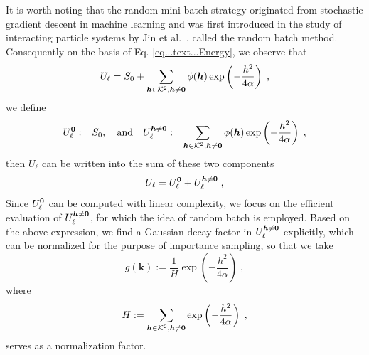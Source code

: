 It is worth noting that the random mini-batch strategy originated from stochastic gradient descent in machine learning and was first introduced in the study of interacting particle systems by Jin et al.~\cite{jin2020random}, called the random batch method. Consequently
on the basis of Eq. \eqref{eq...text...Energy},  we observe that 
\[
U_\ell =   S_0+ \sum_{\boldsymbol{h}\in\mathcal{K}^2,\boldsymbol{h}\neq\bm{0}}\phi(\boldsymbol{h}) \exp\left(-\frac{h^2}{4\alpha}\right) \;,
\]
we define 
\begin{equation}\label{eq::U_l0_Ulk}
    U_\ell^{\bm{0}} := S_0,\quad\text{and}\quad U_\ell^{\boldsymbol{h}\neq \bm{0}} :=\sum_{\boldsymbol{h}\in\mathcal{K}^2,\boldsymbol{h}\neq\bm{0}}\phi(\boldsymbol{h}) \exp\left(-\frac{h^2}{4\alpha}\right) \;,
\end{equation}
then $U_\ell$ can be written into the sum of these two components
\[
U_\ell= U_\ell^{\bm{0}}+U_\ell^{\boldsymbol{h}\neq \bm{0}}\;,
\]
Since 
$ U_\ell^{\bm{0}}$
can be computed with linear complexity, we focus on the efficient evaluation of 
$U_\ell^{\boldsymbol{h}\neq \bm{0}}$, for which the idea of random batch is employed.
Based on the above expression, we find a Gaussian decay factor in $U_\ell^{\boldsymbol{h}\neq \bm{0}}$ explicitly, which can be normalized for the  purpose of importance sampling, so that we take
\begin{equation}\label{eq::hk}
	g(\bm{k}) := \frac{1}{H} \exp\left(-\frac{h^2}{4\alpha}\right)\;, %
\end{equation}
where \[H:= \sum_{\boldsymbol{h}\in\mathcal{K}^2,\boldsymbol{h}\neq\bm{0}}\exp\left(-\frac{h^2}{4\alpha}\right)\;,\] serves as a normalization factor.
